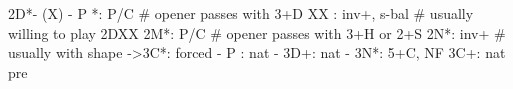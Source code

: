 2D*- (X) -
P *: P/C  # opener passes with 3+D
XX : inv+, s-bal  # usually willing to play 2DXX
2M*: P/C  # opener passes with 3+H or 2+S
2N*: inv+  # usually with shape
   ->3C*: forced
        - P  : nat
        - 3D+: nat
        - 3N*: 5+C, NF
3C+: nat pre
